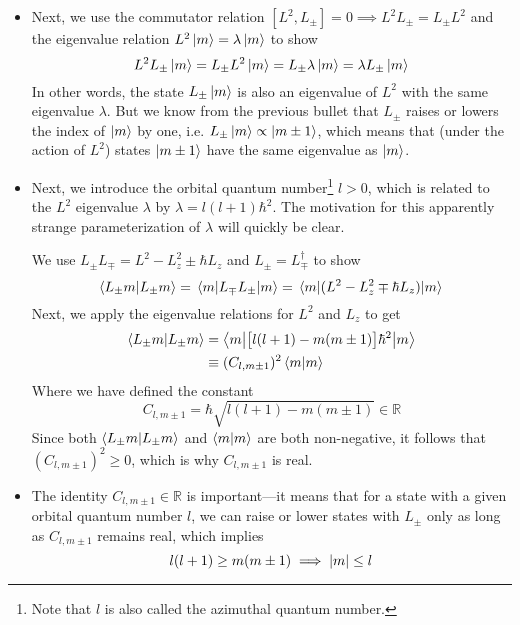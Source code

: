 \documentclass[11pt, a4paper]{article}
\newcommand{\bmel}[3]{\big \langle {#1} \big | {#2} \big | {#3} \big \rangle}  %
\begin{document}
\begin{itemize}
	\item Next, we use the commutator relation $ [L^{2}, L_{\pm}] = 0 \implies L^{2} L_{\pm} = L_{\pm} L^{2}  $ and the eigenvalue relation $ L^{2}\ket{m} = \lambda \ket{m} $ to show
	\begin{equation*}
		L^{2} L_{\pm}\ket{m} = L_{\pm} L^{2} \ket{m} = L_{\pm}\lambda \ket{m} = \lambda L_{\pm} \ket{m}
	\end{equation*}
	In other words, the state $ L_{\pm} \ket{m} $ is also an eigenvalue of $ L^{2} $ with the same eigenvalue $ \lambda $. But we know from the previous bullet that $ L_{\pm} $ raises or lowers the index of $ \ket{m} $ by one, i.e. $ L_{\pm} \ket{m} \propto \ket{m \pm 1} $, which means that (under the action of $ L^{2} $) states $ \ket{m \pm 1} $ have the same eigenvalue as $ \ket{m} $.
	
	\item Next, we introduce the orbital quantum number\footnote{Note that $ l $ is also called the azimuthal quantum number.} $ l > 0 $, which is related to the $ L^{2} $ eigenvalue $ \lambda $ by $ \lambda = l(l+1)\hbar^{2} $. The motivation for this apparently strange parameterization of $ \lambda $ will quickly be clear.
	
	We use $ L_{\pm}L_{\mp} = L^{2} - L_{z}^{2} \pm \hbar L_{z} $ and $ L_{\pm} = L_{\mp}^{\dagger} $ to show
	\begin{equation*}
		\braket{L_{\pm}m}{L_{\pm}m} = \mel{m}{L_{\mp}L_{\pm}}{m} = \mel{m}{(L^{2} - L_{z}^{2} \mp \hbar L_{z})}{m}\\
	\end{equation*}
	Next, we apply the eigenvalue relations for $ L^{2} $ and $ L_{z} $ to get
	\begin{align*}
		\braket{L_{\pm}m}{L_{\pm}m} &= \bmel{m}{\big[l (l+1) - m(m\pm 1)\big]\hbar^{2}}{m}\\
		&\equiv (C_{l,m\pm 1})^{2} \braket{m}{m}
	\end{align*}
	Where we have defined the constant
	\begin{equation*}
		C_{l, m\pm1} = \hbar \sqrt{l (l+1) - m(m\pm 1)} \in \mathbb{R}
	\end{equation*}
	Since both $ \braket{L_{\pm}m}{L_{\pm}m} $ and $ \braket{m}{m} $ are both non-negative, it follows that $ (C_{l,m\pm 1})^{2} \geq 0 $, which is why $ C_{l, m\pm1} $ is real.
	
	\item The identity $  C_{l, m\pm1} \in \mathbb{R} $ is important---it means that for a state with a given orbital quantum number $ l $, we can raise or lower states with $ L_{\pm} $ only as long as $  C_{l, m\pm1} $ remains real, which implies
	\begin{equation*}
		l (l+1) \geq m(m\pm 1) \implies \abs{m} \leq l
	\end{equation*}
	
\end{itemize}
\end{document}
